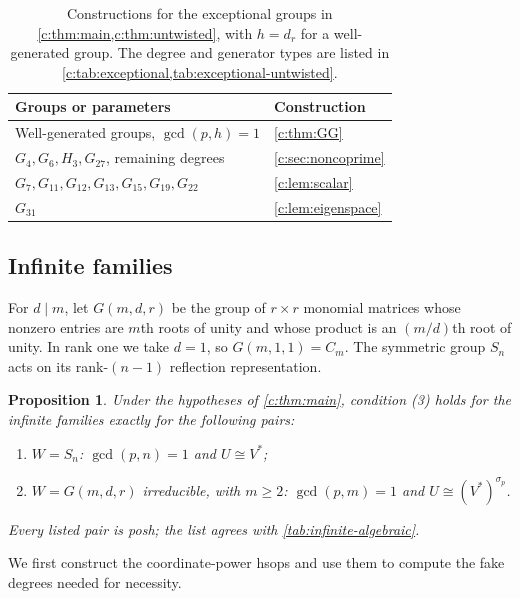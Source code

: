 \documentclass[11pt]{amsart}
\newtheorem{proposition}[theorem]{Proposition}
\theoremstyle{definition}
\begin{document}
\begin{table}[htbp]
\centering
\begin{tabular}{@{}L{.61\textwidth}L{.31\textwidth}@{}}
\toprule
Groups or parameters & Construction\\
\midrule
Well-generated groups, $\gcd(p,h)=1$ & \cref{c:thm:GG}\\
$G_4,G_6,H_3,G_{27}$, remaining degrees & \cref{c:sec:noncoprime}\\
$G_7,G_{11},G_{12},G_{13},$\newline $G_{15},G_{19},G_{22}$ & \cref{c:lem:scalar}\\
$G_{31}$ & \cref{c:lem:eigenspace}\\
\bottomrule
\end{tabular}
\caption{Constructions for the exceptional groups in
\cref{c:thm:main,c:thm:untwisted}, with $h=d_r$ for a
well-generated group. The degree and generator types are listed in
\cref{c:tab:exceptional,tab:exceptional-untwisted}.}
\label{tab:exceptional-methods-overview}
\end{table}

\subsection{Infinite families}\label{c:sec:imprimitive}

For $d\mid m$, let $G(m,d,r)$ be the group of $r\times r$ monomial
matrices whose nonzero entries are $m$th roots of unity and whose
product is an $(m/d)$th root of unity. In rank one we take $d=1$,
so $G(m,1,1)=C_m$. The symmetric group $S_n$ acts on its
rank-$(n-1)$ reflection representation.

\begin{proposition}\label{c:prop:infinite-classification}
Under the hypotheses of \cref{c:thm:main}, condition (3) holds
for the infinite families
exactly for the following pairs:
\begin{enumerate}
\item $W=S_n$: $\gcd(p,n)=1$ and $U\cong V^*$;
\item $W=G(m,d,r)$ irreducible, with $m\ge2$:
$\gcd(p,m)=1$ and $U\cong(V^*)^{\sigma_p}$.
\end{enumerate}
Every listed pair is posh; the list agrees with \cref{tab:infinite-algebraic}.
\end{proposition}

We first construct the coordinate-power hsops and use them to compute
the fake degrees needed for necessity.
\end{document}
